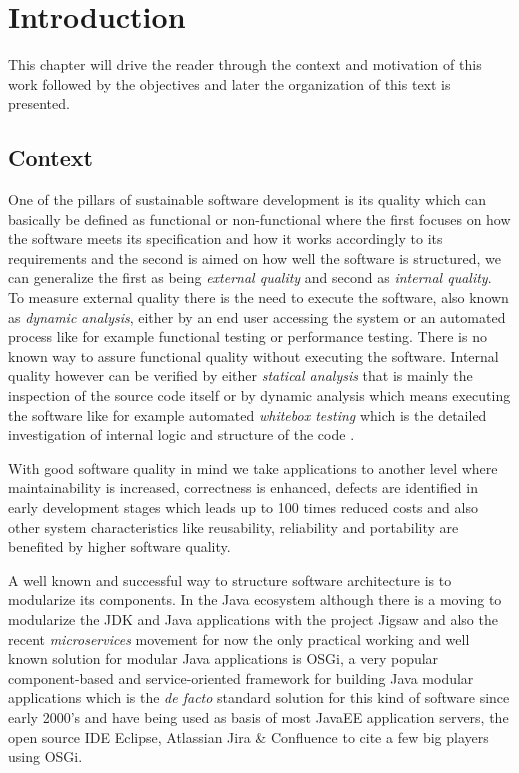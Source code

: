 \chapter{Introduction}
 This chapter will drive the reader through the context and motivation of this work followed by the objectives and later the organization of this text is presented.  
 

\section{Context}

One of the pillars of sustainable software development is its quality which can basically be defined as functional or non-functional where the first focuses on how the software meets its specification and how it works accordingly to its requirements and the second is aimed on how well the software is structured, we can generalize the first as being \emph{external quality} and second as \emph{internal quality}. To measure external quality there is the need to execute the software, also known as \emph{dynamic analysis}, either by an end user accessing the system or an automated process like for example functional testing or performance testing. There is no known way to assure functional quality without executing the software. Internal quality however can be verified by either \emph{statical analysis} that is mainly the inspection of the source code itself or by dynamic analysis which means executing the software like for example automated \emph{whitebox testing} which is the detailed
investigation of internal logic and structure of the code \citep{Khan 2012}.   

With good software quality in mind we take applications to another level where maintainability is increased, correctness is enhanced, defects are identified in early development stages which leads up to 100 times reduced costs \citep{Beohm 2001} and also other system characteristics like reusability, reliability and portability are benefited by higher software quality.  

A well known and successful way to structure software architecture is to modularize its components. In the Java ecosystem although there is a moving to modularize the JDK and Java applications with the project Jigsaw \citep{Krill 2012} and also the recent \emph{microservices} movement \citep{Knorr 2014} for now the only practical working and well known solution for modular Java applications is OSGi, a very popular component-based and service-oriented framework for building Java modular applications which is the \emph{de facto} standard solution for this kind of software since early 2000's and have being used as basis of most JavaEE application servers, the open source IDE Eclipse, Atlassian Jira & Confluence to cite a few big players using OSGi. 

